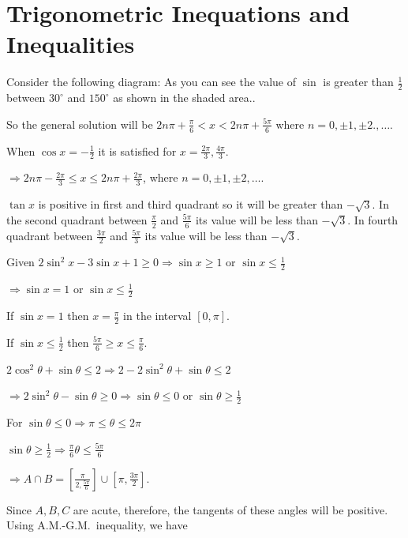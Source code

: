 \chapter{Trigonometric Inequations and Inequalities}
\startitemize[n, 1*broad]
\item Consider the following diagram:
  \startplacefigure
    \externalfigure[35_1.pdf]
  \stopplacefigure
  As you can see the value of $\sin$ is greater than $\frac{1}{2}$ between $30^\circ$ and $150^\circ$ as
  shown in the shaded area..

  So the general solution will be $2n\pi + \frac{\pi}{6} < x < 2n\pi + \frac{5\pi}{6}$ where $n = 0, \pm1,
  \pm 2., \ldots$.
\item When $\cos x = -\frac{1}{2}$ it is satisfied for $x = \frac{2\pi}{3}, \frac{4\pi}{3}$.

  $\Rightarrow 2n\pi - \frac{2\pi}{3}\leq x\leq 2n\pi + \frac{2\pi}{3}$, where $n = 0, \pm 1, \pm2, \ldots$.
\item $\tan x$ is positive in first and third quadrant so it will be greater than $-\sqrt{3}$. In the second
  quadrant between $\frac{\pi}{2}$ and $\frac{5\pi}{6}$ its value will be less than $-\sqrt{3}$. In fourth
  quadrant between $\frac{3\pi}{2}$ and $\frac{5\pi}{3}$ its value will be less than $-\sqrt{3}$.
\item Given $2\sin^2x - 3\sin x + 1\geq 0\Rightarrow \sin x\geq 1$ or $\sin x \leq \frac{1}{2}$

  $\Rightarrow \sin x = 1$ or $\sin x\leq \frac{1}{2}$

  If $\sin x = 1$ then $x = \frac{\pi}{2}$ in the interval $[0, \pi]$.

  If $\sin x\leq \frac{1}{2}$ then $\frac{5\pi}{6}\geq x\leq \frac{\pi}{6}$.
\item $2\cos^2\theta + \sin\theta \leq 2\Rightarrow 2 - 2\sin^2\theta + \sin\theta\leq 2$

  $\Rightarrow 2\sin^2\theta - \sin\theta \geq 0 \Rightarrow \sin\theta\leq 0$ or $\sin\theta\geq
  \frac{1}{2}$

  For $\sin\theta \leq 0 \Rightarrow \pi\leq\theta\leq 2\pi$

  $\sin\theta\geq \frac{1}{2}\Rightarrow \frac{\pi}{6}\theta\leq \frac{5\pi}{6}$

  $\Rightarrow A\cap B = \left[\frac{\pi}{2, \frac{5\pi}{6}}\right]\cup \left[\pi, \frac{3\pi}{2}\right]$.
\item Since $A, B, C$ are acute, therefore,  the tangents of these angles will be positive. Using A.M.-G.M.\
  inequality, we have

